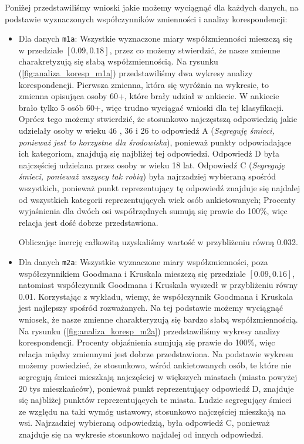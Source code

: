 \documentclass[12pt]{mwart}
\begin{document}
Poniżej przedstawiliśmy wnioski jakie możemy wyciągnąć dla każdych danych, na podstawie wyznaczonych współczynników zmienności i analizy korespondencji:
\begin{itemize}[label=$\bullet$]
	\item Dla danych \verb|m1a|:\newline
		Wszystkie wyznaczone miary współzmienności mieszczą się w przedziale $[0.09, 0.18]$, przez co możemy stwierdzić, że nasze zmienne charakretyzują się słabą współzmiennością.\newline\noindent
		Na rysunku (\ref{fig:analiza_koresp_m1a}) przedstawiliśmy dwa wykresy analizy korespondencji. Pierwsza zmienna, która się wyróżnia na wykresie, to zmienna opisująca osoby 60+, które brały udział w ankiecie. W ankiecie brało tylko 5 osób 60+, więc trudno wyciągać wnioski dla tej klasyfikacji. Oprócz tego możemy stwierdzić, że stosunkowo najczęstszą odpowiedzią jakie udzielały osoby w wieku 46 , 36  i 26  to odpowiedź A (\emph{Segreguję śmieci, ponieważ jest to korzystne dla środowiska}), ponieważ punkty odpowiadające ich kategoriom, znajdują się najbliżej tej odpowiedzi. Odpowiedź D była najczęściej udzielana przez osoby w wieku 18  lat. Odpowiedź C (\emph{Segreguję śmieci, ponieważ wszyscy tak robią}) była najrzadziej wybieraną spośród wszystkich, ponieważ punkt reprezentujący tę odpowiedź znajduje się najdalej od wszystkich  kategorii reprezentujących wiek osób ankietowanych;\newline\noindent
		Procenty wyjaśnienia dla dwóch osi współrzędnych sumują się prawie do 100\%, więc relacja jest dość dobrze przedstawiona.
		
		Obliczając inercję całkowitą uzyskaliśmy wartość w przybliżeniu równą 0.032.
	\item Dla danych \verb|m2a|:\newline
		Wszystkie wyznaczone miary współzmienności, poza współczynnikiem Goodmana i Kruskala mieszczą się przedziale $[0.09, 0.16]$, natomiast współczynnik Goodmana i Kruskala wyszedł w przybliżeniu równy 0.01. Korzystając z wykładu, wiemy, że współczynnik Goodmana i Kruskala jest najlepszy spośród rozważanych. Na tej podstawie możemy wyciągnąć wniosek, że nasze zmienne charakteryzują się bardzo słabą współzmiennością. \newline\noindent
		Na rysunku (\ref{fig:analiza_koresp_m2a}) przedstawiliśmy wykresy analizy korespondencji. Procenty objaśnienia sumjują się prawie do 100\%, więc relacja między zmiennymi jest dobrze przedstawiona. Na podstawie wykresu możemy powiedzieć, że stosunkowo, wśród ankietowanych osób, te które nie segregują śmieci mieszkają najczęściej w większych miastach (miasta powyżej 20 tys mieszkańców), ponieważ punkt reprezentujący odpowiedź D, znajduje się najbliżej punktów reprezentujących te miasta. Ludzie segregujący śmieci ze względu na taki wymóg ustawowy, stosunkowo najczęściej mieszkają na wsi. Najrzadziej wybieraną odpowiedzią, była odpowiedź C, ponieważ znajduje się na wykresie stosunkowo najdalej od innych odpowiedzi.
		

\end{itemize}
\end{document}

